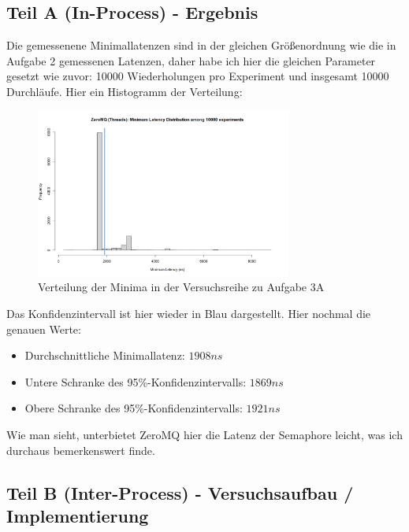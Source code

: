 \documentclass[12pt]{article}
\begin{document}
\subsection{Teil A (In-Process) - Ergebnis}
Die gemessenene Minimallatenzen sind in der gleichen Größenordnung wie die in Aufgabe 2 gemessenen Latenzen, daher habe ich hier die gleichen Parameter gesetzt wie zuvor: 10000 Wiederholungen pro Experiment und insgesamt 10000 Durchläufe. Hier ein Histogramm der Verteilung:

\begin{figure}[H]
	\centering
	\includegraphics[width=0.75\textwidth]{./img/zeromq_inproc}
	\caption{Verteilung der Minima in der Versuchsreihe zu Aufgabe 3A}
	\label{img:zeromq:inproc}
\end{figure}

Das Konfidenzintervall ist hier wieder in Blau dargestellt.
Hier nochmal die genauen Werte:
\begin{itemize}
	\item Durchschnittliche Minimallatenz: $1908 ns$
	\item Untere Schranke des 95\%-Konfidenzintervalls: $1869 ns$
	\item Obere Schranke des 95\%-Konfidenzintervalls: $1921 ns$
\end{itemize}

Wie man sieht, unterbietet ZeroMQ hier die Latenz der Semaphore leicht, was ich durchaus bemerkenswert finde.

\subsection{Teil B (Inter-Process) - Versuchsaufbau / Implementierung}
\end{document}
